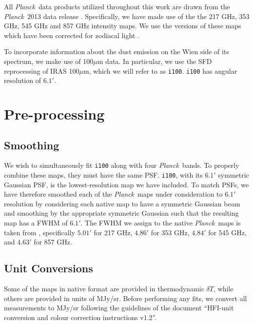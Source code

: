 \documentclass{emulateapj}
\newcommand{\PLANCK}{{\it Planck}}
\begin{document}
All \PLANCK~data products utilized throughout this work are drawn from the 
\PLANCK~2013 data release \citep{planck2013}. Specifically, we have made use 
of the the 217 GHz, 353 GHz, 545 GHz and 857 GHz intensity maps. We use the 
versions of these maps which have been corrected for zodiacal light 
\citep[\texttt{R1.10\_nominal\_ZodiCorrected},][]{planckzodi}.



To incorporate information about the dust emission on the Wien side of its 
spectrum, we make use of 100$\mu$m data. In particular, we use the SFD 
reprocessing of IRAS 100$\mu$m, which we will refer to as \verb|i100|. \verb|i100| has angular resolution of $6.1'$. %

\section{Pre-processing}

\subsection{Smoothing}
We wish to simultaneously fit \verb|i100| along with four \PLANCK~bands. To 
properly combine these maps, they must have the same PSF. \verb|i100|, with its
$6.1'$ symmetric Gaussian PSF, is the lowest-resolution map we have included. 
To match PSFs, we have therefore smoothed each of the \PLANCK~maps under 
consideration to $6.1'$ resolution by considering each native map to have
a symmetric Gaussian beam and smoothing by the appropriate symmetric Gaussian
such that the resulting map has a FWHM of $6.1'$. The FWHM we assign to the 
native \PLANCK~maps is taken from \cite{planckbeam}, specifically $5.01'$ for
217 GHz, $4.86'$ for 353 GHz, $4.84'$ for 545 GHz, and $4.63'$ for 857 GHz.

\subsection{Unit Conversions}

Some of the maps in native format are provided in thermodynamic $\delta T$, 
while others are provided in units of MJy/sr. Before performing any fits, 
we convert all measurements to MJy/sr following the guidelines of the document
``HFI-unit conversion and colour correction instructions v1.2''.
\end{document}
